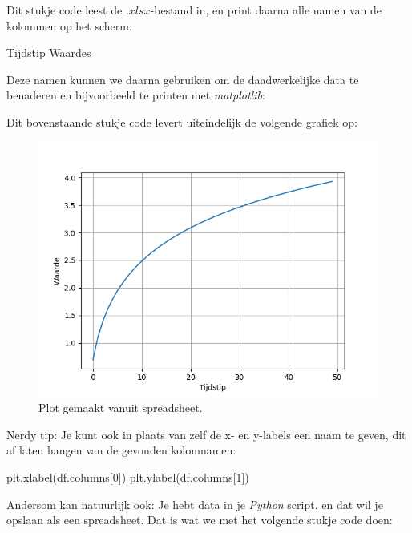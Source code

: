 Dit stukje code leest de $.xlsx$-bestand in, en print daarna alle namen van de kolommen op het scherm:
\begin{python}
Tijdstip
Waardes
\end{python}

Deze namen kunnen we daarna gebruiken om de daadwerkelijke data te benaderen en bijvoorbeeld te printen met \textit{matplotlib}:


Dit bovenstaande stukje code levert uiteindelijk de volgende grafiek op:

\begin{figure}[h!]
\centering\includegraphics[scale=0.7]{Pictures/chapter07/plot3.png}
\caption{Plot gemaakt vanuit spreadsheet.}
\label{fig:plot3} %
\end{figure}

\begin{remark}
Nerdy tip: Je kunt ook in plaats van zelf de x- en y-labels een naam te geven, dit af laten hangen van de gevonden kolomnamen:
\begin{python}
plt.xlabel(df.columns[0])
plt.ylabel(df.columns[1])
\end{python}
\end{remark}

\newpage

Andersom kan natuurlijk ook: Je hebt data in je \textit{Python} script, en dat wil je opslaan als een spreadsheet. Dat is wat we met het volgende stukje code doen:


